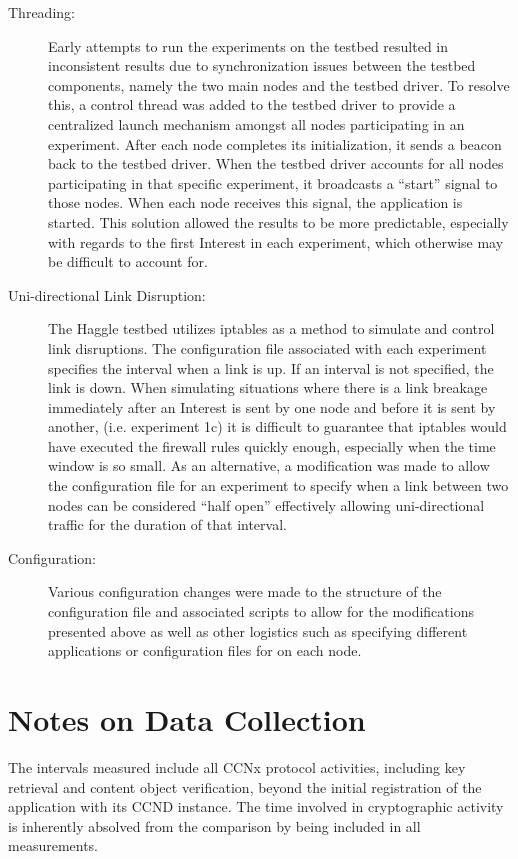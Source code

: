 \documentclass[a4paper,12pt]{report}      %
\begin{document}
\begin{description}
\item[Threading:] Early attempts to run the experiments on the testbed resulted in inconsistent results due to
synchronization issues between the testbed components, namely the two main nodes and the testbed
driver. To resolve this, a control thread was added to the testbed driver to provide a centralized launch
mechanism amongst all nodes participating in an experiment. After each node completes its
initialization, it sends a beacon back to the testbed driver. When the testbed driver accounts for all nodes participating 
in that specific experiment, it broadcasts a “start” signal to those nodes. When each node receives this signal, 
the application is started. This solution allowed the results to be more predictable, especially with regards to the first Interest in each experiment, which otherwise may be difficult to account for.

\item[Uni-directional Link Disruption:] The Haggle testbed utilizes iptables as a method to simulate and
control link disruptions. The configuration file associated with each experiment specifies the interval
when a link is up. If an interval is not specified, the link is down. When simulating situations where there is a link breakage immediately after an Interest is sent by one node and before it is sent by another, (i.e. experiment 1c) it is difficult to guarantee that iptables would have executed the firewall rules quickly enough, especially when the time window is so small. As an
alternative, a modification was made to allow the configuration file for an experiment to specify when
a link between two nodes can be considered “half open” effectively allowing uni-directional traffic for
the duration of that interval.

\item[Configuration:] Various configuration changes were made to the structure of the configuration file and
associated scripts to allow for the modifications presented above as well as other logistics such as
specifying different applications or configuration files for on each node.
\end{description}

\section{Notes on Data Collection}
The intervals measured include all CCNx protocol activities, including key retrieval and content object
verification, beyond the initial registration of the application with its CCND instance. The time
involved in cryptographic activity is inherently absolved from the comparison by being included in all
measurements.
\end{document}
